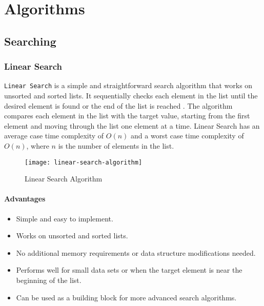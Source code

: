 


\section{Algorithms}






\subsection{Searching}


\subsubsection{Linear Search}
\lstinline{Linear Search} is a simple and straightforward search algorithm that works on unsorted and sorted lists. It sequentially checks each element in the list until the desired element is found or the end of the list is reached \cite{shaalaa_linear_search}. The algorithm compares each element in the list with the target value, starting from the first element and moving through the list one element at a time. Linear Search has an average case time complexity of $O(n)$ and a worst case time complexity of $O(n)$, where $n$ is the number of elements in the list.

\begin{figure}[htbp]
    \centering
    \texttt{[image: linear-search-algorithm]}
    \caption{Linear Search Algorithm \cite{ravikiran_linear_search}}
    \label{fig:linear-search-algorithm}
\end{figure}

\paragraph{Advantages}
\begin{itemize}
    \item Simple and easy to implement.
    \item Works on unsorted and sorted lists.
    \item No additional memory requirements or data structure modifications needed.
    \item Performs well for small data sets or when the target element is near the beginning of the list.
    \item Can be used as a building block for more advanced search algorithms.
\end{itemize}
